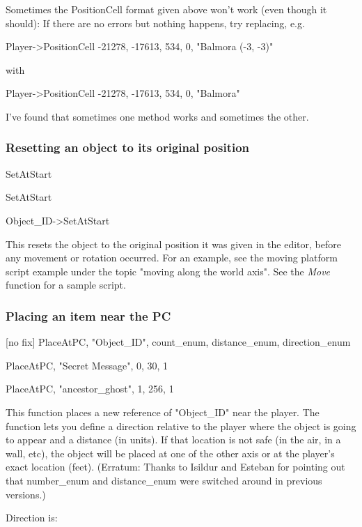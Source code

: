 \documentclass[
]{article}
\begin{document}
Sometimes the PositionCell format given above won't work (even though it
should): If there are no errors but nothing happens, try replacing, e.g.

Player-\textgreater PositionCell -21278, -17613, 534, 0, "Balmora (-3,
-3)"

with

Player-\textgreater PositionCell -21278, -17613, 534, 0, "Balmora"

I've found that sometimes one method works and sometimes the other.

\hypertarget{resetting-an-object-to-its-original-position}{%
\subsubsection{Resetting an object to its original
position}\label{resetting-an-object-to-its-original-position}}

SetAtStart

SetAtStart

Object\_ID-\textgreater SetAtStart

This resets the object to the original position it was given in the
editor, before any movement or rotation occurred. For an example, see
the moving platform script example under the topic "moving along the
world axis". See the \emph{Move} function for a sample script.

\hypertarget{placing-an-item-near-the-pc}{%
\subsubsection{Placing an item near the
PC}\label{placing-an-item-near-the-pc}}

{[}no fix{]} PlaceAtPC, "Object\_ID", count\_enum, distance\_enum,
direction\_enum

PlaceAtPC, "Secret Message", 0, 30, 1

PlaceAtPC, "ancestor\_ghost", 1, 256, 1

This function places a new reference of "Object\_ID" near the player.
The function lets you define a direction relative to the player where
the object is going to appear and a distance (in units). If that
location is not safe (in the air, in a wall, etc), the object will be
placed at one of the other axis or at the player's exact location
(feet). (Erratum: Thanks to Isildur and Esteban for pointing out that
number\_enum and distance\_enum were switched around in previous
versions.)

Direction is:
\end{document}

